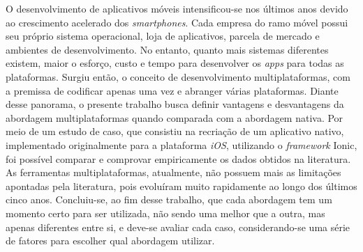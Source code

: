 \begin{resumo}
\begin{comment}
 O resumo deve ressaltar o objetivo, o método, os resultados e as conclusões 
 do documento. A ordem e a extensão
 destes itens dependem do tipo de resumo (informativo ou indicativo) e do
 tratamento que cada item recebe no documento original. O resumo deve ser
 precedido da referência do documento, com exceção do resumo inserido no
 próprio documento. (\ldots) As palavras-chave devem figurar logo abaixo do
 resumo, antecedidas da expressão Palavras-chave:, separadas entre si por
 ponto e finalizadas também por ponto. O texto pode conter no mínimo 150 e 
 no máximo 500 palavras, é aconselhável que sejam utilizadas 200 palavras. 
 E não se separa o texto do resumo em parágrafos.

 O desenvolvimento de aplicativos móveis cresceu muito nos últimos anos
 devido ao crescimento acelerado dos \textit{smartphones}. Com isso, surgiram 
 lojas de aplicativos, ambientes e \textit{SDK's} diferentes para 
 cada sistema operacional móvel. No entanto, quanto mais sistemas diferentes 
 existem, maior o esforço para desenvolver os \textit{apps} para todas 
 as plataformas. Com essa gama de plataformas diferentes, invariavelmente,
 o desenvolvedor precisará escolher qual plataforma irá seguir. Surge, então, uma forma 
 de desenvolvimento com a premissa de resolver 
 o problema da criação de um \textit{apps} para cada plataforma. 
 Essa solução ficou conhecida como desenvolvimento multiplataformas e possui
 vantagens e desvantagens em relação ao desenvolvimento nativo. Será feita uma
 pesquisa e um estudo de caso para avaliar essas vantagens e desvantagens de 
 maneira empírica e assim definir uma forma de escolher qual abordagem deve ser 
 adotada em cada caso específico.
\end{comment}

 O desenvolvimento de aplicativos móveis intensificou-se nos últimos anos devido ao crescimento acelerado dos \textit{smartphones}. Cada empresa
 do ramo móvel possui seu próprio sistema operacional, loja de aplicativos, parcela de mercado e ambientes de desenvolvimento. No entanto, quanto mais 
 sistemas diferentes existem, maior o esforço, custo e tempo para desenvolver os \textit{apps} para todas as plataformas. Surgiu então, o conceito de desenvolvimento multiplataformas,
 com a premissa de codificar apenas uma vez e abranger várias plataformas. Diante desse panorama, o presente trabalho busca definir vantagens e desvantagens da abordagem
 multiplataformas quando comparada com a abordagem nativa. Por meio de um estudo de caso, que consistiu na recriação de um aplicativo nativo, implementado originalmente para a plataforma \textit{iOS},
 utilizando o \textit{framework} Ionic, foi possível comparar e comprovar empiricamente os dados obtidos na literatura. As ferramentas multiplataformas, atualmente,
 não possuem mais as limitações apontadas pela literatura, pois evoluíram muito rapidamente ao longo dos últimos cinco anos. Concluiu-se, ao fim desse trabalho, que cada abordagem tem um momento certo
 para ser utilizada, não sendo uma melhor que a outra, mas apenas diferentes entre si, e deve-se avaliar cada caso, considerando-se uma série de fatores para escolher qual abordagem utilizar.


\end{resumo}
